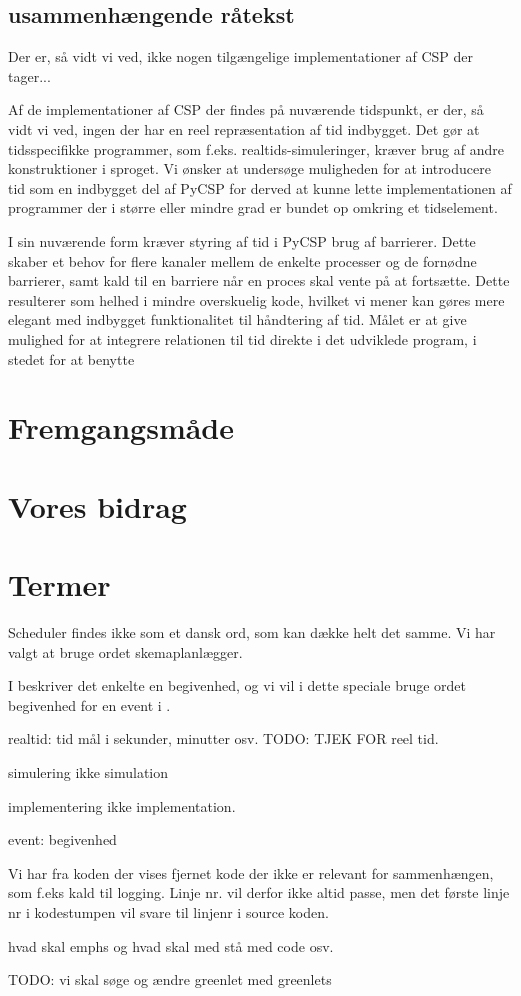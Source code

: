\subsection{usammenhængende råtekst}
Der er, så vidt vi ved, ikke nogen tilgængelige implementationer af CSP der 
tager... 

Af de implementationer af CSP der findes på nuværende tidspunkt, er der, så 
vidt vi ved, ingen der har en reel repræsentation af tid indbygget. Det gør at 
tidsspecifikke programmer, som f.eks. realtids-simuleringer, kræver brug af 
andre konstruktioner i sproget.
Vi ønsker at undersøge muligheden for at introducere tid som en indbygget del 
af PyCSP for derved at kunne lette implementationen af programmer der i større 
eller mindre grad er bundet op omkring et tidselement. 


I sin nuværende form kræver styring af tid i PyCSP brug af 
barrierer. Dette skaber et 
behov for flere kanaler mellem de enkelte processer og de fornødne barrierer, 
samt kald til en barriere når en proces skal vente på at fortsætte.  Dette 
resulterer som helhed i mindre overskuelig kode, hvilket vi mener kan gøres 
mere elegant med indbygget funktionalitet til håndtering af tid. Målet er at 
give mulighed for at integrere relationen til tid direkte i det udviklede 
program, i stedet for at benytte 

\section{Fremgangsmåde}
\section{Vores bidrag}
\section{Termer}

\begin{list}{}{}
\tightlist
\item Scheduler findes ikke som et dansk ord, som kan  dække helt det samme. Vi har valgt at bruge ordet skemaplanlægger.
\item I \des beskriver det enkelte  en begivenhed, og vi vil i dette speciale bruge ordet begivenhed for en event i \des. 
\item realtid: tid mål i sekunder, minutter osv. TODO: TJEK FOR reel tid.
\item simulering ikke simulation
\item implementering ikke implementation.
\item event: begivenhed
\item Vi har fra koden der vises fjernet kode der ikke er relevant for sammenhængen, som f.eks kald til logging. Linje nr. vil derfor ikke altid passe, men det første linje nr i kodestumpen vil svare til linjenr i source koden.
\item hvad skal emphs og hvad skal med stå med code osv.
\item TODO: vi skal søge og ændre greenlet med greenlets
\end{list}


